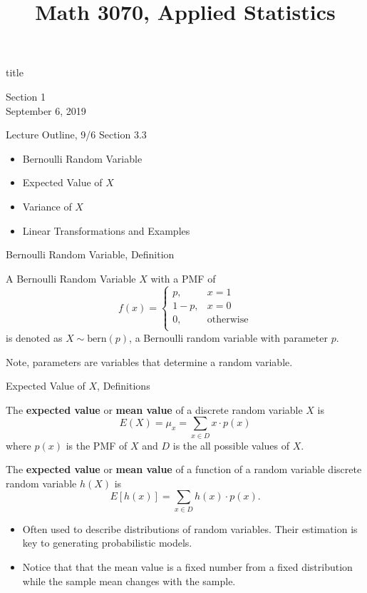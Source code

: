 \documentclass[]{beamer}
\title{Math 3070, Applied Statistics}
\newcommand{\nl}[1]{\vspace{#1 em}}
\begin{document}
\begin{frame}
    \begin{beamercolorbox}[rounded=true,wd=\textwidth,center]{title}
        \inserttitle
    \end{beamercolorbox}
    \begin{center}
        Section 1\\
        \nl{0.5}
        September 6, 2019
    \end{center}
\end{frame}

\begin{frame}{Lecture Outline, 9/6}
    Section 3.3
    \begin{itemize}
        \item Bernoulli Random Variable
        \item Expected Value of $X$
        \item Variance of $X$
        \item Linear Transformations and Examples
    \end{itemize}
\end{frame}

\begin{frame}{Bernoulli Random Variable, Definition}
    \begin{block}{}
        A Bernoulli Random Variable $X$ with a PMF of
        $$f(x)= \left\{\begin{array}{lr}
            p, & x = 1\\
            1-p, & x= 0\\
            0, & \text{otherwise}\\
            \end{array}\right.$$
            is denoted as $X \sim \text{bern}(p)$, a Bernoulli random variable with parameter $p$.
    \end{block}
    Note, parameters are variables that determine a random variable.
\end{frame}

\begin{frame}{Expected Value of $X$, Definitions}
    \begin{block}{}
        The \textbf{expected value} or \textbf{mean value} of a discrete random variable $X$ is 
        $$E(X) = \mu_x = \sum_{x \in D} x \cdot p(x) $$
        where $p(x)$ is the PMF of $X$ and $D$ is the all possible values of $X$.
    \end{block}
    \begin{block}{}
        The \textbf{expected value} or \textbf{mean value} of a function of a random variable discrete random variable $h(X)$ is 
        $$E[h(x)] = \sum_{x \in D} h(x) \cdot p(x) .$$
    \end{block}
    \begin{itemize}
        \item Often used to describe distributions of random variables. Their estimation is key to generating probabilistic models.
        \item Notice that that the mean value is a fixed number from a fixed distribution while the sample mean changes with the sample.
    \end{itemize}
\end{frame}
\end{document}
